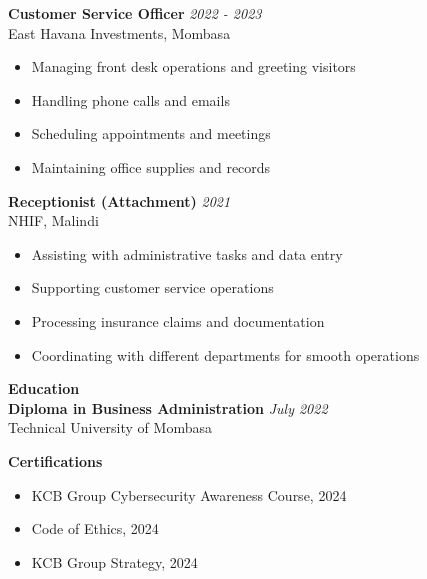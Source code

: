 \documentclass[a4paper,10pt]{article}
\begin{document}
\vspace{2mm}

\textbf{Customer Service Officer} \hfill \textit{2022 - 2023} \\
East Havana Investments, Mombasa \\
\begin{itemize}[leftmargin=*]
    \item Managing front desk operations and greeting visitors
    \item Handling phone calls and emails
    \item Scheduling appointments and meetings
    \item Maintaining office supplies and records
\end{itemize}

\vspace{2mm}

\textbf{Receptionist (Attachment)} \hfill \textit{2021} \\
NHIF, Malindi \\
\begin{itemize}[leftmargin=*]
    \item Assisting with administrative tasks and data entry
    \item Supporting customer service operations
    \item Processing insurance claims and documentation
    \item Coordinating with different departments for smooth operations
\end{itemize}

\vspace{4mm}

\noindent\textbf{\large Education} \\
\textbf{Diploma in Business Administration} \hfill \textit{July 2022} \\
Technical University of Mombasa

\vspace{4mm}

\noindent\textbf{\large Certifications}
\begin{itemize}[leftmargin=*]
    \item KCB Group Cybersecurity Awareness Course, 2024
    \item Code of Ethics, 2024
    \item KCB Group Strategy, 2024
\end{itemize}
\end{document}

